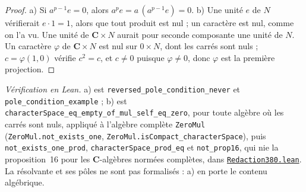 \begin{proof}
a) Si $a^{p-1} e = 0$, alors $a^p e = a\,(a^{p-1} e) = 0$. b) Une unité $e$ de $N$ vérifierait $e \cdot 1 = 1$, alors que tout produit est nul ; un caractère est nul, comme on l'a vu. Une unité de $\mathbf C \times N$ aurait pour seconde composante une unité de $N$. Un caractère $\varphi$ de $\mathbf C \times N$ est nul sur $0 \times N$, dont les carrés sont nuls ; $c = \varphi(1, 0)$ vérifie $c^2 = c$, et $c \neq 0$ puisque $\varphi \neq 0$, donc $\varphi$ est la première projection.
\end{proof}

\begin{sloppypar}
\noindent\emph{Vérification en Lean.} a) est \texttt{reversed\_pole\_condition\_never} et \texttt{pole\_condition\_example} ; b) est \texttt{characterSpace\_eq\_empty\_of\_mul\_self\_eq\_zero}, pour toute algèbre où les carrés sont nuls, appliqué à l'algèbre complète \texttt{ZeroMul} (\texttt{ZeroMul.not\_exists\_one}, \texttt{ZeroMul.isCompact\_characterSpace}), puis \texttt{not\_exists\_one\_prod}, \texttt{characterSpace\_prod\_eq} et \texttt{not\_prop16}, qui nie la proposition~16 pour les $\mathbf C$-algèbres normées complètes, dans \href{\leanblobmain/Redaction380.lean}{\texttt{Redaction380.\allowbreak{}lean}}. La résolvante et ses pôles ne sont pas formalisés : a) en porte le contenu algébrique.
\end{sloppypar}

